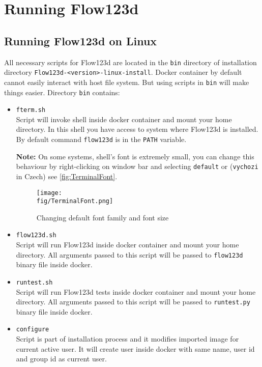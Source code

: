 \documentclass[12pt,a4paper]{report}
\def\fig{figures}
\begin{document}
\section{Running Flow123d}

\subsection{Running Flow123d on Linux}
\label{subsec:running-flow123d-on-linux}
All necessary scripts for Flow123d are located in the \verb'bin' directory of installation directory \verb'Flow123d-<version>-linux-install'.
Docker container by default cannot easily interact with host file system. But using scripts in \verb'bin' will make things easier.
Directory \verb'bin' contains:
\begin{itemize}
	\item \verb'fterm.sh' \\
	 Script will invoke shell inside docker container and mount your home directory.
	 In this shell you have access to system where Flow123d is installed. By default command \verb'flow123d' is in the \verb'PATH' variable.
	 
	\textbf{Note:} On some systems, shell's font is extremely small, you can change this behaviour by right-clicking on window bar and selecting 
	\verb'default' or (\verb'vychozi' in Czech) see \autoref{fig:TerminalFont}.
	 \begin{figure}
		 \center
		 \texttt{[image: \\fig/TerminalFont.png]}
		 \caption{Changing default font family and font size}
		 \label{fig:TerminalFont}
	 \end{figure}

	\item \verb'flow123d.sh' \\
	 Script will run Flow123d inside docker container and mount your home  directory.
	 All arguments passed to this script will be passed to \verb'flow123d' binary file inside docker.

	\item \verb'runtest.sh' \\
	 Script will run Flow123d tests inside docker container and mount your home  directory.
	 All arguments passed to this script will be passed to \verb'runtest.py' binary file inside docker.
	 
	\item \verb'configure' \\
	 Script is part of installation process and it modifies imported image for current active user. It will create user inside docker
	 with same name, user id and group id as current user.	 	 
\end{itemize}
\end{document}
